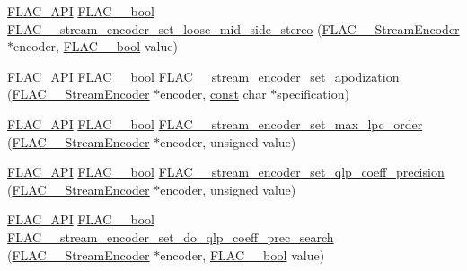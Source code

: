 \begin{DoxyCompactItemize}
\item 
\hyperlink{group__flac__export_ga56ca07df8a23310707732b1c0007d6f5}{F\+L\+A\+C\+\_\+\+A\+PI} \hyperlink{ordinals_8h_a95103469f1cbd78b8cf250194985b34e}{F\+L\+A\+C\+\_\+\+\_\+bool} \hyperlink{group__flac__stream__encoder_ga7b7d294dccd5df7c6c67e75f59798f48}{F\+L\+A\+C\+\_\+\+\_\+stream\+\_\+encoder\+\_\+set\+\_\+loose\+\_\+mid\+\_\+side\+\_\+stereo} (\hyperlink{struct_f_l_a_c_____stream_encoder}{F\+L\+A\+C\+\_\+\+\_\+\+Stream\+Encoder} $\ast$encoder, \hyperlink{ordinals_8h_a95103469f1cbd78b8cf250194985b34e}{F\+L\+A\+C\+\_\+\+\_\+bool} value)
\item 
\hyperlink{group__flac__export_ga56ca07df8a23310707732b1c0007d6f5}{F\+L\+A\+C\+\_\+\+A\+PI} \hyperlink{ordinals_8h_a95103469f1cbd78b8cf250194985b34e}{F\+L\+A\+C\+\_\+\+\_\+bool} \hyperlink{group__flac__stream__encoder_ga83d38fd6fca7abbf8363bdc2536a299e}{F\+L\+A\+C\+\_\+\+\_\+stream\+\_\+encoder\+\_\+set\+\_\+apodization} (\hyperlink{struct_f_l_a_c_____stream_encoder}{F\+L\+A\+C\+\_\+\+\_\+\+Stream\+Encoder} $\ast$encoder, \hyperlink{zconf_8h_a2c212835823e3c54a8ab6d95c652660e}{const} char $\ast$specification)
\item 
\hyperlink{group__flac__export_ga56ca07df8a23310707732b1c0007d6f5}{F\+L\+A\+C\+\_\+\+A\+PI} \hyperlink{ordinals_8h_a95103469f1cbd78b8cf250194985b34e}{F\+L\+A\+C\+\_\+\+\_\+bool} \hyperlink{group__flac__stream__encoder_gac3bde5abdaa340674c5659e2e85d2611}{F\+L\+A\+C\+\_\+\+\_\+stream\+\_\+encoder\+\_\+set\+\_\+max\+\_\+lpc\+\_\+order} (\hyperlink{struct_f_l_a_c_____stream_encoder}{F\+L\+A\+C\+\_\+\+\_\+\+Stream\+Encoder} $\ast$encoder, unsigned value)
\item 
\hyperlink{group__flac__export_ga56ca07df8a23310707732b1c0007d6f5}{F\+L\+A\+C\+\_\+\+A\+PI} \hyperlink{ordinals_8h_a95103469f1cbd78b8cf250194985b34e}{F\+L\+A\+C\+\_\+\+\_\+bool} \hyperlink{group__flac__stream__encoder_ga0888d739c952ff73456bf90e48634514}{F\+L\+A\+C\+\_\+\+\_\+stream\+\_\+encoder\+\_\+set\+\_\+qlp\+\_\+coeff\+\_\+precision} (\hyperlink{struct_f_l_a_c_____stream_encoder}{F\+L\+A\+C\+\_\+\+\_\+\+Stream\+Encoder} $\ast$encoder, unsigned value)
\item 
\hyperlink{group__flac__export_ga56ca07df8a23310707732b1c0007d6f5}{F\+L\+A\+C\+\_\+\+A\+PI} \hyperlink{ordinals_8h_a95103469f1cbd78b8cf250194985b34e}{F\+L\+A\+C\+\_\+\+\_\+bool} \hyperlink{group__flac__stream__encoder_ga3aa94a1aec1cf40c37e54434c86bb50d}{F\+L\+A\+C\+\_\+\+\_\+stream\+\_\+encoder\+\_\+set\+\_\+do\+\_\+qlp\+\_\+coeff\+\_\+prec\+\_\+search} (\hyperlink{struct_f_l_a_c_____stream_encoder}{F\+L\+A\+C\+\_\+\+\_\+\+Stream\+Encoder} $\ast$encoder, \hyperlink{ordinals_8h_a95103469f1cbd78b8cf250194985b34e}{F\+L\+A\+C\+\_\+\+\_\+bool} value)

\end{DoxyCompactItemize}
